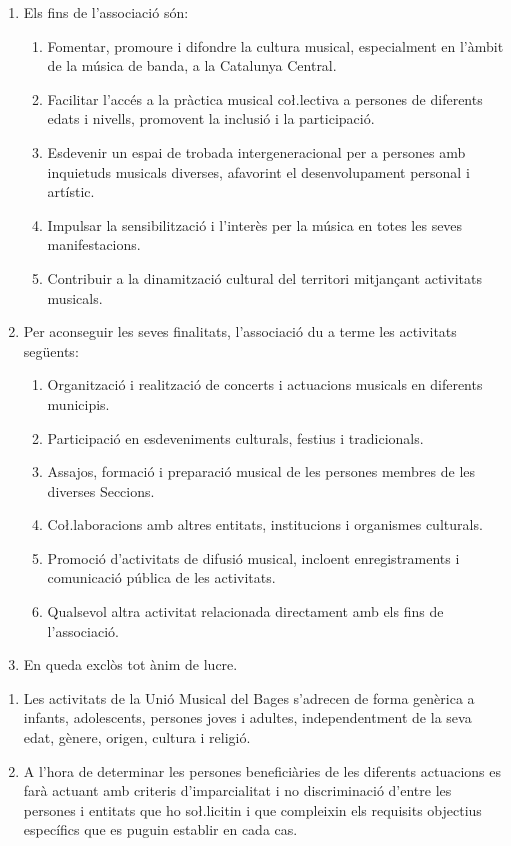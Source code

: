 \documentclass[11pt,a4paper]{article}
\newcommand{\UMB}{Unió Musical del Bages\xspace}
\begin{document}
\begin{enumerate}
    \item Els fins de l'associació són:
    \begin{enumerate}
        \item Fomentar, promoure i difondre la cultura musical, especialment en l'àmbit de la música de banda, a la Catalunya Central.
        \item Facilitar l'accés a la pràctica musical co\l.lectiva a persones de diferents edats i nivells, promovent la inclusió i la participació.
        \item Esdevenir un espai de trobada intergeneracional per a persones amb inquietuds musicals diverses, afavorint el desenvolupament personal i artístic.
        \item Impulsar la sensibilització i l'interès per la música en totes les seves manifestacions.
        \item Contribuir a la dinamització cultural del territori mitjançant activitats musicals.
    \end{enumerate}
    \item Per aconseguir les seves finalitats, l'associació du a terme les activitats següents:
    \begin{enumerate}
        \item Organització i realització de concerts i actuacions musicals en diferents municipis.
        \item Participació en esdeveniments culturals, festius i tradicionals.
        \item Assajos, formació i preparació musical de les persones membres de les diverses Seccions.
        \item Co\l.laboracions amb altres entitats, institucions i organismes culturals.
        \item Promoció d'activitats de difusió musical, incloent enregistraments i comunicació pública de les activitats.
        \item Qualsevol altra activitat relacionada directament amb els fins de l'associació.
    \end{enumerate}
    \item En queda exclòs tot ànim de lucre.
\end{enumerate}


\begin{enumerate}
    \item Les activitats de la \UMB s'adrecen de forma genèrica a infants, adolescents, persones joves i adultes, independentment de la seva edat, gènere, origen, cultura i religió.
    \item A l'hora de determinar les persones beneficiàries de les diferents actuacions es farà actuant amb criteris d'imparcialitat i no discriminació d'entre les persones i entitats que ho so\l.licitin i que compleixin els requisits objectius específics que es puguin establir en cada cas.
\end{enumerate}
\end{document}
